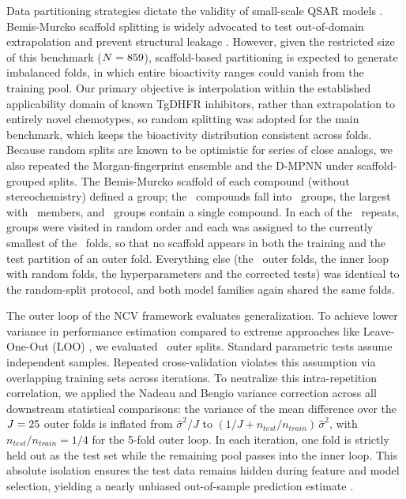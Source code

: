 Data partitioning strategies dictate the validity of small-scale QSAR models \cite{kyrali2022}. Bemis-Murcko scaffold splitting is widely advocated to test out-of-domain extrapolation and prevent structural leakage \cite{yang2019, aga2025, beatrice2026}. However, given the restricted size of this benchmark ($N = 859$), scaffold-based partitioning is expected to generate imbalanced folds, in which entire bioactivity ranges could vanish from the training pool. Our primary objective is interpolation within the established applicability domain of known TgDHFR inhibitors, rather than extrapolation to entirely novel chemotypes, so random splitting was adopted for the main benchmark, which keeps the bioactivity distribution consistent across folds. Because random splits are known to be optimistic for series of close analogs, we also repeated the Morgan-fingerprint ensemble and the D-MPNN under scaffold-grouped splits. The Bemis-Murcko scaffold of each compound (without stereochemistry) defined a group; the \NCompounds\ compounds fall into \ScaffoldNGroups\ groups, the largest with \ScaffoldLargestGroup\ members, and \ScaffoldSingletonGroups\ groups contain a single compound. In each of the \OuterRepeats\ repeats, groups were visited in random order and each was assigned to the currently smallest of the \OuterKFolds\ folds, so that no scaffold appears in both the training and the test partition of an outer fold. Everything else (the \TotalOuterFolds\ outer folds, the inner loop with random folds, the hyperparameters and the corrected tests) was identical to the random-split protocol, and both model families again shared the same folds.

The outer loop of the NCV framework evaluates generalization. To achieve lower variance in performance estimation compared to extreme approaches like Leave-One-Out (LOO) \cite{krstajic2014}, we evaluated \TotalOuterFolds\ outer splits. Standard parametric tests assume independent samples. Repeated cross-validation violates this assumption via overlapping training sets across iterations. To neutralize this intra-repetition correlation, we applied the Nadeau and Bengio variance correction \cite{nadeau1999} across all downstream statistical comparisons: the variance of the mean difference over the $J = 25$ outer folds is inflated from $\hat{\sigma}^2/J$ to $(1/J + n_{test}/n_{train})\,\hat{\sigma}^2$, with $n_{test}/n_{train} = 1/4$ for the 5-fold outer loop. In each iteration, one fold is strictly held out as the test set while the remaining pool passes into the inner loop. This absolute isolation ensures the test data remains hidden during feature and model selection, yielding a nearly unbiased out-of-sample prediction estimate \cite{varma2006, wainer2021}.

